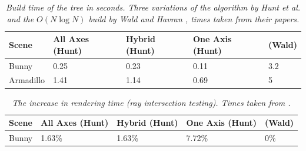 \documentclass[12pt]{article}
\begin{document}
\begin{table}
\centering
\begin{tabular}{|l|l|l|l|l|}
\toprule
Scene & All Axes (Hunt) & Hybrid (Hunt) & One Axis (Hunt) & (Wald)\\
\midrule
Bunny & 0.25 & 0.23 & 0.11 & 3.2\\
Armadillo & 1.41 & 1.14 & 0.69 & 5\\
\bottomrule
\end{tabular}
\caption{\textit{Build time of the tree in seconds. Three variations of the algorithm by Hunt et al. \cite{hunt2006fast} and the $O(N\log N)$ build by Wald and Havran \cite{wald2006building}, times taken from their papers.}}
\label{table:12comp}
\end{table}
\begin{table}
\centering
\begin{tabular}{|l|l|l|l|l|}
\toprule
Scene & All Axes (Hunt) & Hybrid (Hunt) & One Axis (Hunt) & (Wald)\\
\midrule
Bunny & 1.63\%  & 1.63\% & 7.72\% & 0\% \\
\bottomrule
\end{tabular}
\caption{\textit{The increase in rendering time (ray intersection testing). Times taken from \cite{hunt2006fast}.}}
\label{table:reninc}
\end{table}
\end{document}
